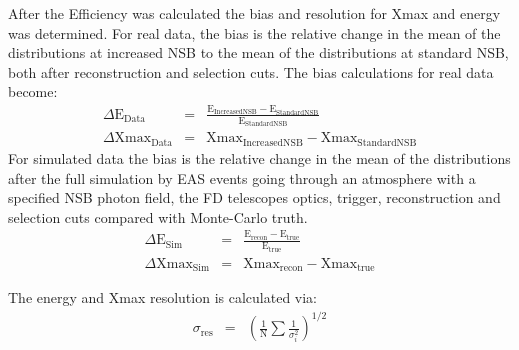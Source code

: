 After the Efficiency was calculated the bias and resolution for Xmax and energy was determined. For real data, the bias is the relative change in the mean of the distributions at increased NSB to the mean of the distributions at standard NSB, both after reconstruction and selection cuts. The bias calculations for real data become:
\begin{eqnarray}
\Delta \mathrm{E}_{\mathrm{Data}} &=& \frac{\mathrm{E}_{\mathrm{IncreasedNSB}} - \mathrm{E}_{\mathrm{StandardNSB}}}{\mathrm{E}_{\mathrm{StandardNSB}}} \label{eq:energybias_data} \\
\Delta \mathrm{Xmax}_{\mathrm{Data}} &=& \mathrm{Xmax}_{\mathrm{IncreasedNSB}} - \mathrm{Xmax}_{\mathrm{StandardNSB}}\label{eq:xmaxbias_data}
\end{eqnarray} 
For simulated data the bias is the relative change in the mean of the distributions after the full simulation by EAS events going through an atmosphere with a specified NSB photon field, the FD telescopes optics, trigger, reconstruction and selection cuts compared with Monte-Carlo truth.
\begin{eqnarray}
\Delta \mathrm{E}_{\mathrm{Sim}} &=& \frac{\mathrm{E}_{\mathrm{recon}} - \mathrm{E}_{\mathrm{true}}}{\mathrm{E}_{\mathrm{true}}}  \label{eq:energybias_sim} \\
\Delta \mathrm{Xmax}_{\mathrm{Sim}} &=& \mathrm{Xmax}_{\mathrm{recon}} - \mathrm{Xmax}_{\mathrm{true}} \label{eq:xmaxbias_sim}
\end{eqnarray}
 
 
The energy and Xmax resolution is calculated via:
\begin{eqnarray}
\sigma_{\mathrm{res}} &=& \left( \frac{1}{\mathrm{N}} \sum \frac{1}{\sigma^2_i} \right)^{1/2}
\end{eqnarray}


